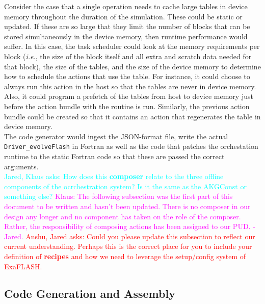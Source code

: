 \documentclass{article}
\newcommand{\code}[1]{{\tt#1}}
\newcommand{\FlashOfTheFuture}{ExaFLASH\xspace}
\newcommand{\ie}{\textit{i.e.}}   %
\newcommand{\AnshuQfromJO}[1]   {\textcolor{red}{Anshu, Jared asks: #1}}
\newcommand{\JaredQfromKW}[1]   {\textcolor{cyan}{Jared, Klaus asks: #1}}
\newcommand{\KlausRfromJO}[1]   {\textcolor{magenta}{Klaus: #1 - Jared.}}
\newcommand{\shortPUD}   {PUD\xspace}
\newcommand{\shortKGC}  {AKGConst\xspace}     %
\newcommand{\PUD}    {\shortPUD}
\newcommand{\KGC}       {\shortKGC}
\begin{document}
Consider the case that a single operation needs to cache large tables in device
memory throughout the duration of the simulation.  These could be static or
updated.  If these are so large that they limit the number of blocks that can be
stored simultaneously in the device memory, then runtime performance would
suffer.  In this case, the task scheduler could look at the memory requirements
per block (\ie, the size of the block itself and all extra and scratch data
needed for that block), the size of the tables, and the size of the device
memory to determine how to schedule the actions that use the table.  For
instance, it could choose to always run this action in the host so that the
tables are never in device memory.  Also, it could program a prefetch of the
tables from host to device memory just before the action bundle with the routine
is run.  Similarly, the previous action bundle could be created so that it
contains an action that regenerates the table in device memory.\\

The code generator would ingest the JSON-format file, write the actual
\code{Driver\_evolveFlash} in Fortran as well as the code that patches the
orchestation runtime to the static Fortran code so that these are passed the
correct arguments.\\

\JaredQfromKW{How does this \textbf{composer} relate to the three
offline components of the ocrchestration system?
Is it the same as the \KGC or something else?}
\KlausRfromJO{The following subsection was the first part of this document to be
written and hasn't been updated.  There is no composer in our design any longer
and no component has taken on the role of the composer.  Rather, the responsibility
of composing actions has been assigned to our \PUD.}
\AnshuQfromJO{Could you please update this subsection to reflect our current
understanding.  Perhaps this is the correct place for you to include your
definition of \textbf{recipes} and how we need to leverage the setup/config
system of \FlashOfTheFuture.}

\subsection{Code Generation and Assembly}
\label{sec:code-generation}
\end{document}
